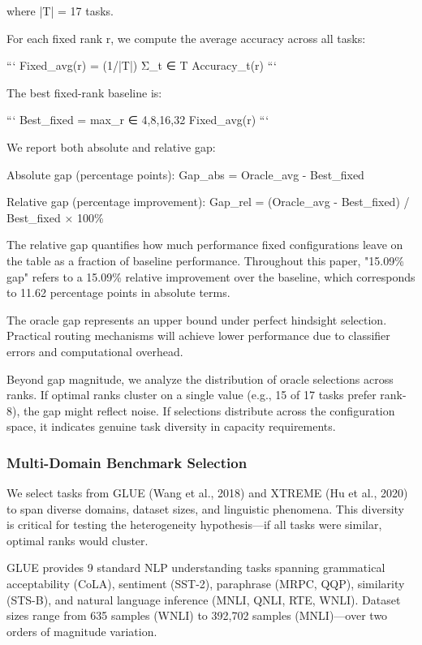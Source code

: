 where |T| = 17 tasks.

For each fixed rank r, we compute the average accuracy across all tasks:

```
Fixed_avg(r) = (1/|T|) Σ_{t ∈ T} Accuracy_t(r)
```

The best fixed-rank baseline is:

```
Best_fixed = max_{r ∈ {4,8,16,32}} Fixed_avg(r)
```

We report both absolute and relative gap:

Absolute gap (percentage points): Gap_abs = Oracle_avg - Best_fixed

Relative gap (percentage improvement): Gap_rel = (Oracle_avg - Best_fixed) / Best_fixed × 100\%

The relative gap quantifies how much performance fixed configurations leave on the table as a fraction of baseline performance. Throughout this paper, "15.09\% gap" refers to a 15.09\% relative improvement over the baseline, which corresponds to 11.62 percentage points in absolute terms.

The oracle gap represents an upper bound under perfect hindsight selection. Practical routing mechanisms will achieve lower performance due to classifier errors and computational overhead.

Beyond gap magnitude, we analyze the distribution of oracle selections across ranks. If optimal ranks cluster on a single value (e.g., 15 of 17 tasks prefer rank-8), the gap might reflect noise. If selections distribute across the configuration space, it indicates genuine task diversity in capacity requirements.

\subsubsection{Multi-Domain Benchmark Selection}

We select tasks from GLUE (Wang et al., 2018) and XTREME (Hu et al., 2020) to span diverse domains, dataset sizes, and linguistic phenomena. This diversity is critical for testing the heterogeneity hypothesis—if all tasks were similar, optimal ranks would cluster.

GLUE provides 9 standard NLP understanding tasks spanning grammatical acceptability (CoLA), sentiment (SST-2), paraphrase (MRPC, QQP), similarity (STS-B), and natural language inference (MNLI, QNLI, RTE, WNLI). Dataset sizes range from 635 samples (WNLI) to 392,702 samples (MNLI)—over two orders of magnitude variation.

